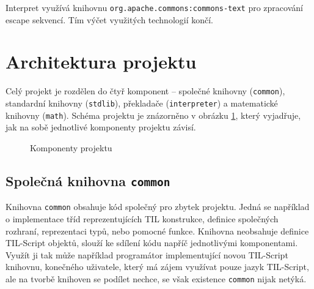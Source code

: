 Interpret využívá knihovnu \lstinline{org.apache.commons:commons-text} pro zpracování escape
sekvencí. Tím výčet využitých technologií končí.

\section{Architektura projektu}

Celý projekt je rozdělen do čtyř komponent -- společné knihovny (\lstinline{common}), standardní
knihovny (\lstinline{stdlib}), překladače (\lstinline{interpreter}) a matematické knihovny
(\lstinline{math}). Schéma projektu je znázorněno v obrázku \ref{fig:project-structure}, který
vyjadřuje, jak na sobě jednotlivé komponenty projektu závisí.

\begin{figure}
    \centering
    \caption{Komponenty projektu}
    \label{fig:project-structure}
\end{figure}

\subsection{Společná knihovna \lstinline{common}}

Knihovna \lstinline{common} obsahuje kód společný pro zbytek projektu. Jedná se například
o implementace tříd reprezentujících TIL konstrukce, definice společných rozhraní, reprezentaci
typů, nebo pomocné funkce. Knihovna neobsahuje definice TIL-Script objektů, slouží ke sdílení kódu
napříč jednotlivými komponentami. Využít ji tak může například programátor implementující novou
TIL-Script knihovnu, konečného uživatele, který má zájem využívat pouze jazyk TIL-Script,
ale na tvorbě knihoven se podílet nechce, se však existence \lstinline{common} nijak netýká.

